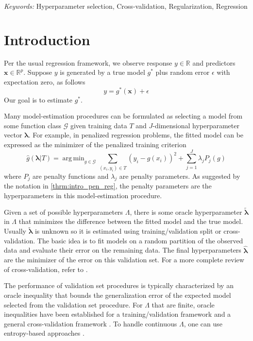 \documentclass[12pt]{article}
\DeclareMathOperator*{\argmin}{arg\,min}
\begin{document}
\noindent%
{\it Keywords:}  Hyperparameter selection, Cross-validation, Regularization, Regression
\vfill

\newpage
{}
\section{Introduction}

Per the usual regression framework, we observe response $y \in \mathbb{R}$ and predictors $\boldsymbol {x} \in \mathbb{R}^p$. Suppose $y$ is generated by a true model $g^*$ plus random error $\epsilon$ with expectation zero, as follows
\begin{equation}
\label{true_model}
y = g^*(\boldsymbol x) + \epsilon
\end{equation}
Our goal is to estimate $g^*$.

Many model-estimation procedures can be formulated as selecting a model from some function class $\mathcal{G}$ given training data $T$ and $J$-dimensional hyperparameter vector $\boldsymbol{\lambda}$. For example, in penalized regression problems, the fitted model can be expressed as the minimizer of the penalized training criterion
\begin{equation}
\label{thrm:intro_pen_reg}
\hat{g}(\boldsymbol \lambda | T) = \argmin_{g\in \mathcal{G}} \sum_{(x_i, y_i) \in T} \left (y_i -  g(x_i) \right )^2 + \sum_{j=1}^J \lambda_j P_j(g)
\end{equation}
where $P_j$ are penalty functions and $\lambda_j$ are penalty parameters. As suggested by the notation in \eqref{thrm:intro_pen_reg}, the penalty parameters are the hyperparameters in this model-estimation procedure.

Given a set of possible hyperparameters $\Lambda$, there is some oracle hyperparameter $\tilde{\boldsymbol{\lambda}}$ in $\Lambda$ that minimizes the difference between the fitted model and the true model. Usually $\tilde{\boldsymbol{\lambda}}$ is unknown so it is estimated using training/validation split or cross-validation. The basic idea is to fit models on a random partition of the observed data and evaluate their error on the remaining data. The final hyperparameters $\hat{\boldsymbol{\lambda}}$ are the minimizer of the error on this validation set. For a more complete review of cross-validation, refer to \citet{arlot2010survey}.

The performance of validation set procedures is typically characterized by an oracle inequality that bounds the generalization error of the expected model selected from the validation set procedure. For $\Lambda$ that are finite, oracle inequalities have been established for a training/validation framework \citet{gyorfi2006distribution} and a general cross-validation framework \citep{van2003unified, van2004asymptotic}. To handle continuous $\Lambda$, one can use entropy-based approaches \citep{lecue2012oracle}. 
\end{document}
